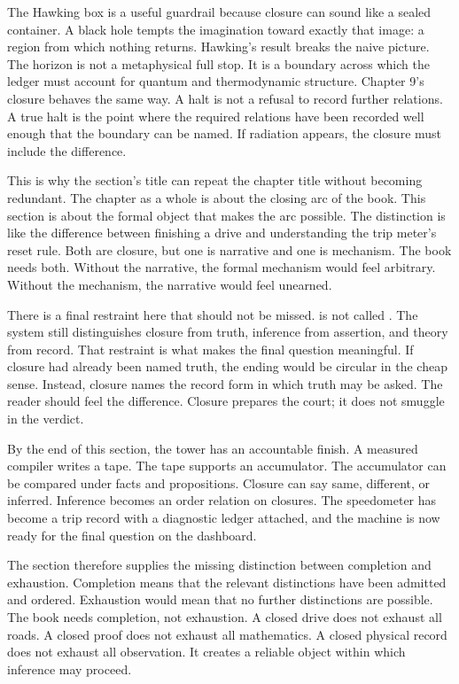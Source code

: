The Hawking box is a useful guardrail because closure can sound like a sealed
container. A black hole tempts the imagination toward exactly that image: a
region from which nothing returns. Hawking's result breaks the naive picture.
The horizon is not a metaphysical full stop. It is a boundary across which the
ledger must account for quantum and thermodynamic structure. Chapter 9's
closure behaves the same way. A halt is not a refusal to record further
relations. A true halt is the point where the required relations have been
recorded well enough that the boundary can be named. If radiation appears,
the closure must include the difference.

This is why the section's title can repeat the chapter title without becoming
redundant. The chapter as a whole is about the closing arc of the book. This
section is about the formal object that makes the arc possible. The distinction
is like the difference between finishing a drive and understanding the trip
meter's reset rule. Both are closure, but one is narrative and one is
mechanism. The book needs both. Without the narrative, the formal mechanism
would feel arbitrary. Without the mechanism, the narrative would feel
unearned.

There is a final restraint here that should not be missed.  is
not called . The system still distinguishes closure from truth,
inference from assertion, and theory from record. That restraint is what makes
the final  question meaningful. If closure had already
been named truth, the ending would be circular in the cheap sense. Instead,
closure names the record form in which truth may be asked. The reader should
feel the difference. Closure prepares the court; it does not smuggle in the
verdict.

By the end of this section, the tower has an accountable finish. A measured
compiler writes a tape. The tape supports an accumulator. The accumulator can
be compared under facts and propositions. Closure can say same, different, or
inferred. Inference becomes an order relation on closures. The speedometer has
become a trip record with a diagnostic ledger attached, and the machine is now
ready for the final question on the dashboard.

The section therefore supplies the missing distinction between completion and
exhaustion. Completion means that the relevant distinctions have been admitted
and ordered. Exhaustion would mean that no further distinctions are possible.
The book needs completion, not exhaustion. A closed drive does not exhaust all
roads. A closed proof does not exhaust all mathematics. A closed physical
record does not exhaust all observation. It creates a reliable object within
which inference may proceed.

